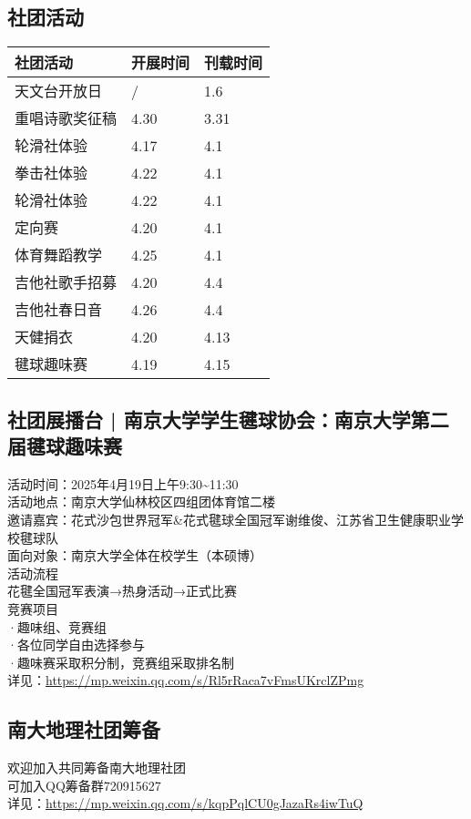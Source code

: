 \documentclass[letterpaper, 12pt]{article}
\begin{document}
\begin{multicols}{2}
\section{社团活动}
\begin{tabular}{|>{\centering\arraybackslash}m{}|m{}|m{}|}
    \hline
    社团活动 & 开展时间 & 刊载时间\\
    \hline\hline
    天文台开放日 & / & 1.6\\
    重唱诗歌奖征稿 & 4.30 & 3.31\\
    轮滑社体验 & 4.17 & 4.1\\
    拳击社体验 & 4.22 & 4.1\\
    轮滑社体验 & 4.22 & 4.1\\
    定向赛 & 4.20 & 4.1\\
    体育舞蹈教学 & 4.25 & 4.1\\
    吉他社歌手招募 & 4.20 & 4.4\\
    吉他社春日音 & 4.26 & 4.4\\
    天健捐衣 & 4.20 & 4.13\\
    毽球趣味赛 & 4.19 & 4.15\\
    \hline
\end{tabular}
\subsection{社团展播台 | 南京大学学生毽球协会：南京大学第二届毽球趣味赛}
活动时间：2025年4月19日上午9:30\textasciitilde{}11:30
\\活动地点：南京大学仙林校区四组团体育馆二楼
\\邀请嘉宾：花式沙包世界冠军\&花式毽球全国冠军谢维俊、江苏省卫生健康职业学校毽球队
\\面向对象：南京大学全体在校学生（本硕博）
\\活动流程
\\花毽全国冠军表演→热身活动→正式比赛
\\竞赛项目
\\·趣味组、竞赛组
\\·各位同学自由选择参与
\\·趣味赛采取积分制，竞赛组采取排名制
\\详见：\url{https://mp.weixin.qq.com/s/Rl5rRaca7vFmsUKrclZPmg}

\subsection{南大地理社团筹备}
欢迎加入共同筹备南大地理社团
\\可加入QQ筹备群720915627
\\详见：\url{https://mp.weixin.qq.com/s/kqpPqlCU0gJazaRs4iwTuQ}

\end{multicols}
\end{document}
